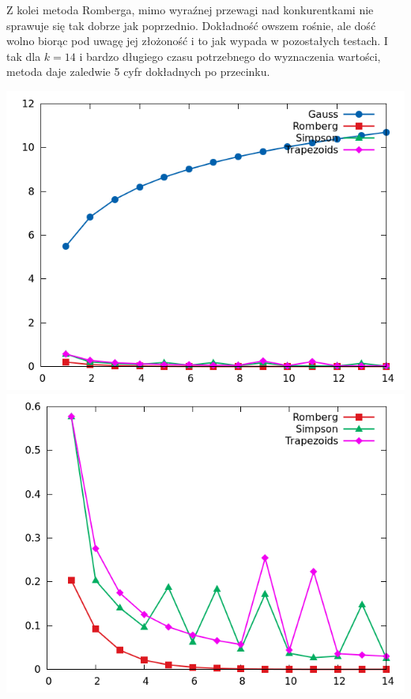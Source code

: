\documentclass[11pt,leqno]{article}
\begin{document}
Z kolei metoda Romberga, mimo wyraźnej przewagi nad konkurentkami nie sprawuje się tak dobrze jak poprzednio. Dokładność owszem rośnie, ale dość wolno biorąc pod uwagę jej złożoność i to jak wypada w pozostałych testach. I tak dla $k = 14$ i bardzo długiego czasu potrzebnego do wyznaczenia wartości, metoda daje zaledwie 5 cyfr dokładnych po przecinku.

\begin{center}
\includegraphics[scale=0.65,natwidth=640,natheight=480]{plot/testa1_14e.png}\\
\includegraphics[scale=0.65,natwidth=640,natheight=480]{plot/testa1_14ezoom.png}
\end{center}
\end{document}
